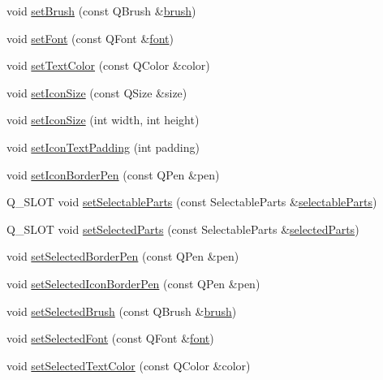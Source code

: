 \begin{DoxyCompactItemize}
\item 
void \hyperlink{classQCPLegend_a497bbcd38baa3598c08e2b3f48103f23}{set\+Brush} (const Q\+Brush \&\hyperlink{classQCPLegend_a7e5d2766e7d724f399022be8a4e8a2cb}{brush})
\item 
void \hyperlink{classQCPLegend_aa4cda8499e3cb0f3be415edc02984c73}{set\+Font} (const Q\+Font \&\hyperlink{classQCPLegend_a5cf8b840bc02f7bf4edb8dde400d0f41}{font})
\item 
void \hyperlink{classQCPLegend_ae1eb239ff4a4632fe1b6c3e668d845c6}{set\+Text\+Color} (const Q\+Color \&color)
\item 
void \hyperlink{classQCPLegend_a8b0740cce488bf7010da6beda6898984}{set\+Icon\+Size} (const Q\+Size \&size)
\item 
void \hyperlink{classQCPLegend_a96b1a37fd4ee6a9778e6e54fe56ab6c2}{set\+Icon\+Size} (int width, int height)
\item 
void \hyperlink{classQCPLegend_a62973bd69d5155e8ea3141366e8968f6}{set\+Icon\+Text\+Padding} (int padding)
\item 
void \hyperlink{classQCPLegend_a2f2c93d18a651f4ff294bb3f026f49b8}{set\+Icon\+Border\+Pen} (const Q\+Pen \&pen)
\item 
Q\+\_\+\+S\+L\+OT void \hyperlink{classQCPLegend_a9ce60aa8bbd89f62ae4fa83ac6c60110}{set\+Selectable\+Parts} (const Selectable\+Parts \&\hyperlink{classQCPLegend_aa90c7fdbad7a0e93527bafb1f1f49a43}{selectable\+Parts})
\item 
Q\+\_\+\+S\+L\+OT void \hyperlink{classQCPLegend_a2aee309bb5c2a794b1987f3fc97f8ad8}{set\+Selected\+Parts} (const Selectable\+Parts \&\hyperlink{classQCPLegend_abbbf1b2d6a149013527ed87b0780894a}{selected\+Parts})
\item 
void \hyperlink{classQCPLegend_a2c35d262953a25d96b6112653fbefc88}{set\+Selected\+Border\+Pen} (const Q\+Pen \&pen)
\item 
void \hyperlink{classQCPLegend_ade93aabe9bcccaf9cf46cec22c658027}{set\+Selected\+Icon\+Border\+Pen} (const Q\+Pen \&pen)
\item 
void \hyperlink{classQCPLegend_a875227f3219c9799464631dec5e8f1bd}{set\+Selected\+Brush} (const Q\+Brush \&\hyperlink{classQCPLegend_a7e5d2766e7d724f399022be8a4e8a2cb}{brush})
\item 
void \hyperlink{classQCPLegend_ab580a01c3c0a239374ed66c29edf5ad2}{set\+Selected\+Font} (const Q\+Font \&\hyperlink{classQCPLegend_a5cf8b840bc02f7bf4edb8dde400d0f41}{font})
\item 
void \hyperlink{classQCPLegend_a7674dfc7a1f30e1abd1018c0ed45e0bc}{set\+Selected\+Text\+Color} (const Q\+Color \&color)

\end{DoxyCompactItemize}
